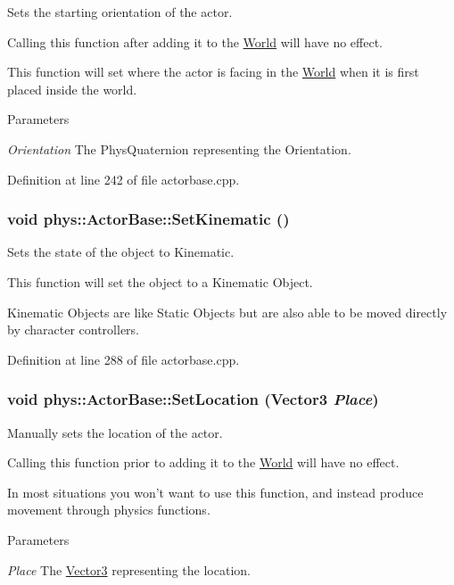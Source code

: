 Sets the starting orientation of the actor. 

Calling this function after adding it to the \hyperlink{classphys_1_1World}{World} will have no effect. \par
 This function will set where the actor is facing in the \hyperlink{classphys_1_1World}{World} when it is first placed inside the world. 
\begin{DoxyParams}{Parameters}
\item[{\em Orientation}]The PhysQuaternion representing the Orientation. \end{DoxyParams}


Definition at line 242 of file actorbase.cpp.

\hypertarget{classphys_1_1ActorBase_acd5613286ec14fb2a8e5ed5f5003dc5f}{
\subsubsection[{SetKinematic}]{\setlength{\rightskip}{0pt plus 5cm}void phys::ActorBase::SetKinematic ()}}
\label{d8/d0f/classphys_1_1ActorBase_acd5613286ec14fb2a8e5ed5f5003dc5f}


Sets the state of the object to Kinematic. 

This function will set the object to a Kinematic Object. \par
 Kinematic Objects are like Static Objects but are also able to be moved directly by character controllers. 

Definition at line 288 of file actorbase.cpp.

\hypertarget{classphys_1_1ActorBase_a3212be459859a67bf7ae64919d58d5a5}{
\subsubsection[{SetLocation}]{\setlength{\rightskip}{0pt plus 5cm}void phys::ActorBase::SetLocation ({\bf Vector3} {\em Place})}}
\label{d8/d0f/classphys_1_1ActorBase_a3212be459859a67bf7ae64919d58d5a5}


Manually sets the location of the actor. 

Calling this function prior to adding it to the \hyperlink{classphys_1_1World}{World} will have no effect. \par
 In most situations you won't want to use this function, and instead produce movement through physics functions. 
\begin{DoxyParams}{Parameters}
\item[{\em Place}]The \hyperlink{classphys_1_1Vector3}{Vector3} representing the location. \end{DoxyParams}



